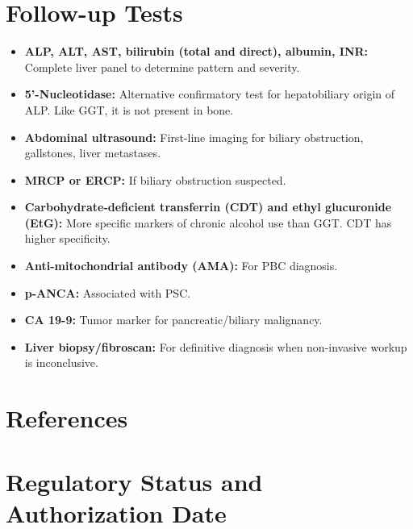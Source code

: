 \section*{Follow-up Tests}
\begin{itemize}
  \item \textbf{ALP, ALT, AST, bilirubin (total and direct), albumin, INR:} Complete liver panel to determine pattern and severity.
  \item \textbf{5'-Nucleotidase:} Alternative confirmatory test for hepatobiliary origin of ALP. Like GGT, it is not present in bone.
  \item \textbf{Abdominal ultrasound:} First-line imaging for biliary obstruction, gallstones, liver metastases.
  \item \textbf{MRCP or ERCP:} If biliary obstruction suspected.
  \item \textbf{Carbohydrate-deficient transferrin (CDT) and ethyl glucuronide (EtG):} More specific markers of chronic alcohol use than GGT. CDT has higher specificity.
  \item \textbf{Anti-mitochondrial antibody (AMA):} For PBC diagnosis.
  \item \textbf{p-ANCA:} Associated with PSC.
  \item \textbf{CA 19-9:} Tumor marker for pancreatic/biliary malignancy.
  \item \textbf{Liver biopsy/fibroscan:} For definitive diagnosis when non-invasive workup is inconclusive.
\end{itemize}

\section*{References}



\clearpage
\section*{Regulatory Status and Authorization Date}

\clearpage
